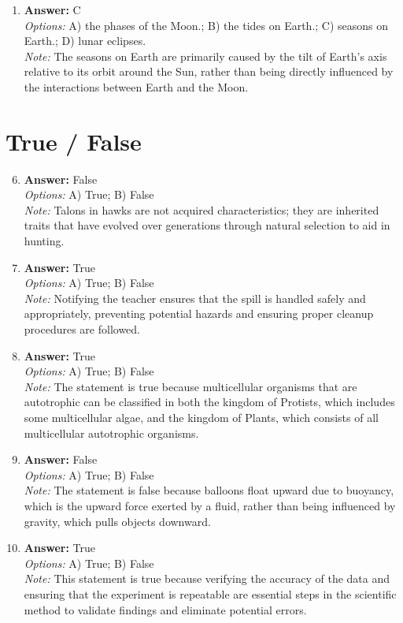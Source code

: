 \documentclass[12pt]{article}
\begin{document}
\begin{enumerate}[label=\arabic*.]
\\ \textit{Note:} The increase in the human population leads to greater demand for natural resources such as water, food, and energy, resulting in a depletion of these essential resources.
\item \textbf{Answer:} C
\\ \textit{Options:} A) the phases of the Moon.; B) the tides on Earth.; C) seasons on Earth.; D) lunar eclipses.
\\ \textit{Note:} The seasons on Earth are primarily caused by the tilt of Earth's axis relative to its orbit around the Sun, rather than being directly influenced by the interactions between Earth and the Moon.
\end{enumerate}

\section*{True / False}
\begin{enumerate}[label=\arabic*.]
\setcounter{enumi}{5}
\item \textbf{Answer:} False
\\ \textit{Options:} A) True; B) False
\\ \textit{Note:} Talons in hawks are not acquired characteristics; they are inherited traits that have evolved over generations through natural selection to aid in hunting.
\item \textbf{Answer:} True
\\ \textit{Options:} A) True; B) False
\\ \textit{Note:} Notifying the teacher ensures that the spill is handled safely and appropriately, preventing potential hazards and ensuring proper cleanup procedures are followed.
\item \textbf{Answer:} True
\\ \textit{Options:} A) True; B) False
\\ \textit{Note:} The statement is true because multicellular organisms that are autotrophic can be classified in both the kingdom of Protists, which includes some multicellular algae, and the kingdom of Plants, which consists of all multicellular autotrophic organisms.
\item \textbf{Answer:} False
\\ \textit{Options:} A) True; B) False
\\ \textit{Note:} The statement is false because balloons float upward due to buoyancy, which is the upward force exerted by a fluid, rather than being influenced by gravity, which pulls objects downward.
\item \textbf{Answer:} True
\\ \textit{Options:} A) True; B) False
\\ \textit{Note:} This statement is true because verifying the accuracy of the data and ensuring that the experiment is repeatable are essential steps in the scientific method to validate findings and eliminate potential errors.
\end{enumerate}
\end{document}
